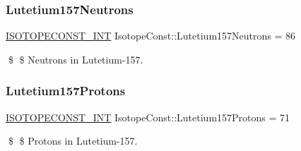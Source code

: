 \subsubsection{\texorpdfstring{Lutetium157\+Neutrons}{Lutetium157Neutrons}}
{\footnotesize\ttfamily \mbox{\hyperlink{group___isotope_const-_macros_ga5f18360b3e99483a35c32d789e62621c}{I\+S\+O\+T\+O\+P\+E\+C\+O\+N\+S\+T\+\_\+\+I\+NT}} Isotope\+Const\+::\+Lutetium157\+Neutrons = 86}

\$ \$ Neutrons in Lutetium-\/157. \mbox{\label{group___isotope_const-_lutetium-_lu157_ga03edb92f07e371e589022a9400632b5e}} 
\subsubsection{\texorpdfstring{Lutetium157\+Protons}{Lutetium157Protons}}
{\footnotesize\ttfamily \mbox{\hyperlink{group___isotope_const-_macros_ga5f18360b3e99483a35c32d789e62621c}{I\+S\+O\+T\+O\+P\+E\+C\+O\+N\+S\+T\+\_\+\+I\+NT}} Isotope\+Const\+::\+Lutetium157\+Protons = 71}

\$ \$ Protons in Lutetium-\/157. 